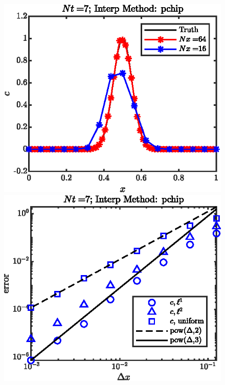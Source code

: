 \documentclass[11pt,letterpaper]{article}
\begin{document}
\begin{figure}[H]
    \centering
    \includegraphics{figs/1D_cons_pchip_sol}
    \includegraphics{figs/1D_cons_pchip_convord}
    \caption{}\label{fig:1D_cons_pchip_}
\end{figure}
\end{document}
